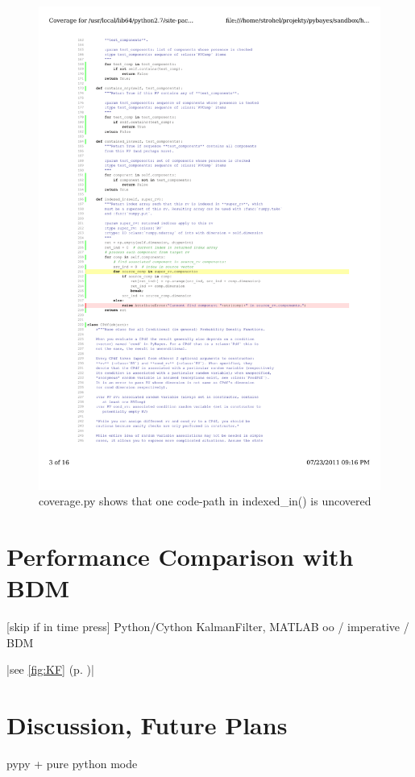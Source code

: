 \begin{figure}[h]
	\centering
	\includegraphics[width=\textwidth,keepaspectratio=true,clip=true,trim=24mm 109mm 60mm 117mm]{./coverage.pdf}
	\vspace{-8mm}
	\caption{coverage.py shows that one code-path in indexed\_in() is uncovered}
	\label{fig:Coverage}
\end{figure}

\section{Performance Comparison with BDM} \label{sec:PyBayesPerformance}

[skip if in time press]
Python/Cython KalmanFilter, MATLAB oo / imperative / BDM

|see \autoref{fig:KF} (p. \pageref{fig:KF})|

\section{Discussion, Future Plans}

pypy + pure python mode
